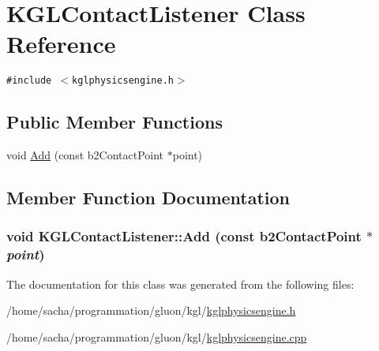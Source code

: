 \hypertarget{class_k_g_l_contact_listener}{
\section{KGLContactListener Class Reference}
\label{class_k_g_l_contact_listener}
}
{\tt \#include $<$kglphysicsengine.h$>$}

\subsection*{Public Member Functions}
\begin{CompactItemize}
\item 
void \hyperlink{class_k_g_l_contact_listener_c1e0677225b0ee3140963d78bc99ae8f}{Add} (const b2ContactPoint $\ast$point)
\end{CompactItemize}


\subsection{Member Function Documentation}
\hypertarget{class_k_g_l_contact_listener_c1e0677225b0ee3140963d78bc99ae8f}{
\subsubsection[{Add}]{\setlength{\rightskip}{0pt plus 5cm}void KGLContactListener::Add (const b2ContactPoint $\ast$ {\em point})}}
\label{class_k_g_l_contact_listener_c1e0677225b0ee3140963d78bc99ae8f}




The documentation for this class was generated from the following files:\begin{CompactItemize}
\item 
/home/sacha/programmation/gluon/kgl/\hyperlink{kglphysicsengine_8h}{kglphysicsengine.h}\item 
/home/sacha/programmation/gluon/kgl/\hyperlink{kglphysicsengine_8cpp}{kglphysicsengine.cpp}\end{CompactItemize}
